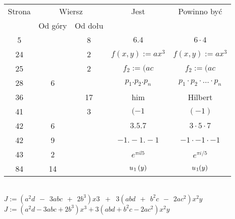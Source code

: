 \documentclass[a4paper,11pt]{article}
\numberwithin{equation}{section}
\begin{document}


\begin{center}

  \begin{tabular}{|c|c|c|c|c|}
    \hline
    Strona & \multicolumn{2}{c|}{Wiersz} & Jest
    & Powinno być \\ \cline{2-3}
    & Od góry & Od dołu & & \\
    \hline
    \hphantom{0}5 & & \hphantom{0}8 & $6.4$ & $6 \cdot 4$ \\
    24 & & \hphantom{0}2 & $f( x, y ) \!\! := \!\! a x^{ 3 }$
    & $f( x, y ) := a x^{ 3 }$ \\
    25 & & \hphantom{0}2 & $f_{ 2 } \!\! := \!\! ( a c$
    & $f_{ 2 } := ( a c$ \\
    28 & \hphantom{0}6 & & $p_{ 1 }.p_{ 2 }.p_{ n }$
    & $p_{ 1 } \cdot p_{ 2 } \cdot \ldots \cdot p_{ n }$ \\
    36 & & 17 & him & Hilbert \\
    41 & & \hphantom{0}3 & $( -1$ & $( -1 )$ \\
    42 & \hphantom{0}6 & & $3.5.7$ & $3 \cdot 5 \cdot 7$ \\
    42 & \hphantom{0}9 & & $-1.\! -1.\! -1$ & $-1 \cdot -1 \cdot -1$ \\
    43 & \hphantom{0}2 & & $e^{ \pi i l 5 }$ & $e^{ \pi i / 5 }$ \\
    84 & 14 & & $u_{ \hspace{0.05em} 1 } \, ( y )$
    & $u_{ \hspace{0.05em} 1 }\hspace{-0.05em}( y )$ \\
    \hline
  \end{tabular}

\end{center}

\VerSpaceTwo


\noindent
{} \\
\Jest $J \!\!
:= \!\! ( a^{ 2 } d \;\, - \;\, 3 a b c \;\, + \;\, 2 b^{ 3 }) \! x3 \;\; +
\;\; 3( a b d \;\, + \;\, b^{ 2 } c \;\, - \;\, 2 a c^{ 2 } ) x^{ 2 } y$
\\[0.3em]
\PowinnoByc $J := ( a^{ 2 } d - 3 a b c + 2 b^{ 3 } ) x^{ 3 } + 3 ( a b d +
b^{ 2 } c - 2 a c^{ 2 } ) x^{ 2 } y$

\end{document}
